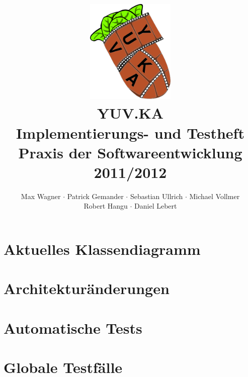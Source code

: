 \documentclass{scrartcl}
\begin{document}
\title{
    \hspace{-0.5cm} \includegraphics[height=5cm]{../../pflichtenheft/resources/logo.png} \\[1cm]
    \Huge{YUV.KA\\Implementierungs- und Testheft} \\ \large{Praxis der Softwareentwicklung 2011/2012}
}
\author{Max Wagner $\cdot$ Patrick Gemander $\cdot$ Sebastian Ullrich $\cdot$ Michael Vollmer \\ Robert Hangu $\cdot$ Daniel Lebert}
\maketitle

\newpage
\mbox{}
\newpage
\mbox{}

\tableofcontents
\clearpage

\section{Aktuelles Klassendiagramm}

\clearpage

\section{Architekturänderungen}

\clearpage

\section{Automatische Tests}

\clearpage

\section{Globale Testfälle}

\clearpage



\end{document}

